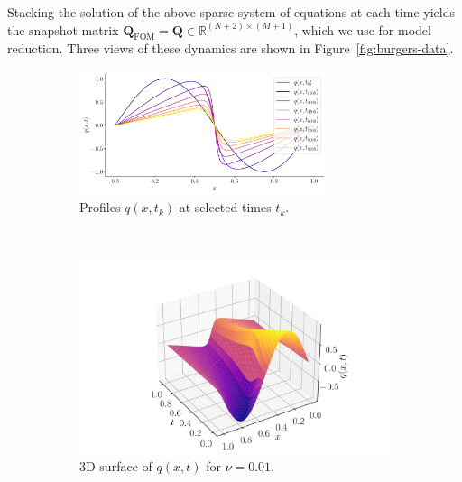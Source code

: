Stacking the solution of the above sparse system of equations at each time yields the snapshot matrix $\mathbf{Q}_{\mathrm{FOM}} = \mathbf{Q}\in\mathbb{R}^{(N+2)\times(M+1)}$, which we use for model reduction.  Three views of these dynamics are shown in Figure~\ref{fig:burgers-data}.

\begin{figure}[h!]
  \centering
  \begin{subfigure}[t]{\textwidth}
    \centering
    \includegraphics[width=0.8\textwidth]{figures/burgers_evol_001.pdf}
    \caption{Profiles \(q(x,t_k)\) at selected times \(t_k\).}
    \label{fig:burgers-surface}
  \end{subfigure}
  \\[1em]
  \begin{subfigure}[t]{0.56\textwidth}
    \centering
    \hspace{-1.5cm}
    \includegraphics[width=\textwidth]{figures/burgers_sol_001.pdf}
    \caption{3D surface of \(q(x,t)\) for \(\nu=0.01\).}
    \label{fig:burgers-slices}
  \end{subfigure}
  \hspace{-1.5cm}
  \begin{subfigure}[t]{0.5\textwidth}
    \centering

\end{subfigure}
\end{figure}

